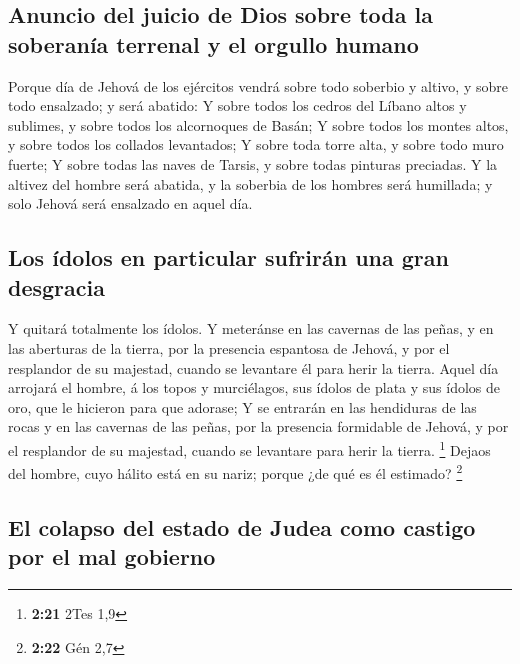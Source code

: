 \hypertarget{anuncio-del-juicio-de-dios-sobre-toda-la-soberanuxeda-terrenal-y-el-orgullo-humano}{%
\subsection{Anuncio del juicio de Dios sobre toda la soberanía terrenal
y el orgullo
humano}\label{anuncio-del-juicio-de-dios-sobre-toda-la-soberanuxeda-terrenal-y-el-orgullo-humano}}

 Porque día de Jehová de los ejércitos vendrá sobre todo
soberbio y altivo, y sobre todo ensalzado; y será abatido:
 Y sobre todos los cedros del Líbano altos y sublimes, y
sobre todos los alcornoques de Basán;  Y sobre todos los
montes altos, y sobre todos los collados levantados;  Y
sobre toda torre alta, y sobre todo muro fuerte;  Y sobre
todas las naves de Tarsis, y sobre todas pinturas preciadas.
 Y la altivez del hombre será abatida, y la soberbia de
los hombres será humillada; y solo Jehová será ensalzado en aquel día.

\hypertarget{los-uxeddolos-en-particular-sufriruxe1n-una-gran-desgracia}{%
\subsection{Los ídolos en particular sufrirán una gran
desgracia}\label{los-uxeddolos-en-particular-sufriruxe1n-una-gran-desgracia}}

 Y quitará totalmente los ídolos.  Y
meteránse en las cavernas de las peñas, y en las aberturas de la tierra,
por la presencia espantosa de Jehová, y por el resplandor de su
majestad, cuando se levantare él para herir la tierra. 
Aquel día arrojará el hombre, á los topos y murciélagos, sus ídolos de
plata y sus ídolos de oro, que le hicieron para que adorase;
 Y se entrarán en las hendiduras de las rocas y en las
cavernas de las peñas, por la presencia formidable de Jehová, y por el
resplandor de su majestad, cuando se levantare para herir la tierra.
\footnote{\textbf{2:21} 2Tes 1,9}  Dejaos del hombre,
cuyo hálito está en su nariz; porque ¿de qué es él estimado? \footnote{\textbf{2:22}
  Gén 2,7}

\hypertarget{el-colapso-del-estado-de-judea-como-castigo-por-el-mal-gobierno}{%
\subsection{El colapso del estado de Judea como castigo por el mal
gobierno}\label{el-colapso-del-estado-de-judea-como-castigo-por-el-mal-gobierno}}

